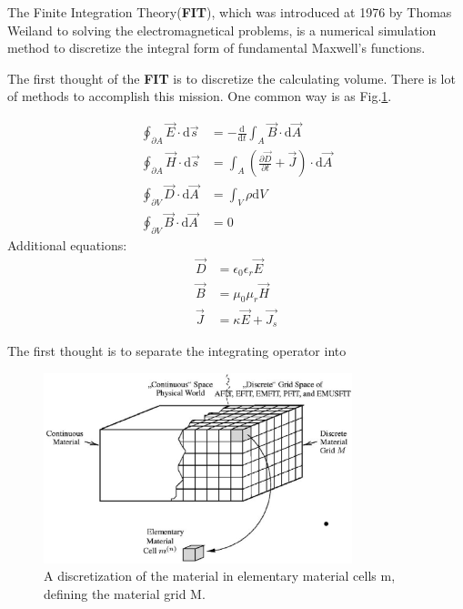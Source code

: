 
The Finite Integration Theory(\textbf{FIT}), which was introduced at 1976 by Thomas Weiland\cite{FIT_discrete_method} to solving the electromagnetical problems, is a numerical simulation method to discretize the integral form of fundamental Maxwell's functions.

The first thought of the \textbf{FIT} is to discretize the calculating volume. There is lot of methods to accomplish this mission. One common way is as Fig.\ref{fig:discretization_material}.


\begin{align}
\oint_{\partial A}\vec{E}\cdot\mathrm{d}\vec{s}&=
-\frac{\mathrm{d}}{\mathrm{d}t}\int_{A}\vec{B}\cdot\mathrm{d}\vec{A}
\label{eq:maxwell_1}\\
\oint_{\partial A}\vec{H}\cdot\mathrm{d}\vec{s}&=
\int_{A}(\frac{\partial\vec{D}}{\partial t}+\vec{J})\cdot\mathrm{d}\vec{A}
\label{eq:maxwell_2}\\
\oint_{\partial V}\vec{D}\cdot\mathrm{d}\vec{A}&=
\int_{V}\rho\mathrm{d}V
\label{eq:maxwell_3}\\
\oint_{\partial V}\vec{B}\cdot\mathrm{d}\vec{A}&=0
\label{eq:maxwell_4}
\end{align}
Additional equations:
\begin{align}
\vec{D}&=\epsilon_{0}\epsilon_{r}\vec{E}
\label{eq:maxwell_5}\\
\vec{B}&=\mu_{0}\mu_{r}\vec{H}
\label{eq:maxwell_6}\\
\vec{J}&=\kappa\vec{E}+\vec{J_{s}}
\label{eq:maxwell_7}
\end{align}

The first thought is to separate the integrating operator into 


\begin{figure}
\includegraphics[width=0.8\textwidth]{bilder/discretization_material}
\caption{A discretization of the material in elementary material cells m, defining the material grid M.}
\label{fig:discretization_material}
\end{figure}


